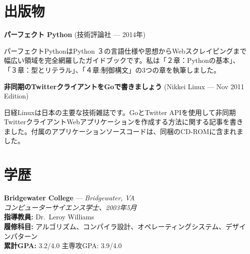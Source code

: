 \documentclass{article}
\begin{document}
\section{出版物}

\begin{list}{}{
    \setlength{\leftmargin}{0cm}	%
    \setlength{\parsep}{0.15cm}
}
    \item \textbf{\large パーフェクト Python} (技術評論社 --- 2014年)

        パーフェクトPythonはPython ３の言語仕様や思想からWebスクレイピングまで幅広い領域を完全網羅したガイドブックです。私は「２章：Pythonの基本」、「３章：型とリテラル」、「４章:制御構文」の3つの章を執筆しました。

    \item \textbf{\large 非同期のTwitterクライアントをGoで書きましょう} (Nikkei Linux --- Nov 2011 Edition)

        日経Linuxは日本の主要な技術雑誌です。GoとTwitter APIを使用して非同期TwitterクライアントWebアプリケーションを作成する方法に関する記事を書きました。付属のアプリケーションソースコードは、同梱のCD-ROMに含まれました。
\end{list}

\section{学歴}

\begin{list}{}{
    \setlength{\leftmargin}{0cm}	%
    \setlength{\parsep}{0.15cm}
}
    \item \textbf{Bridgewater College} --- \emph{Bridgewater, VA}\\
        \emph{コンピューターサイエンス学士、2003年5月}\\
        \textbf{指導教員:} Dr.\ Leroy Williams\\
        \textbf{履修科目:} アルゴリズム、コンパイラ設計、オペレーティングシステム、デザインパターン\\
        \textbf{累計GPA\@:} 3.2/4.0 主専攻GPA\@: 3.9/4.0
\end{list}
\end{document}
